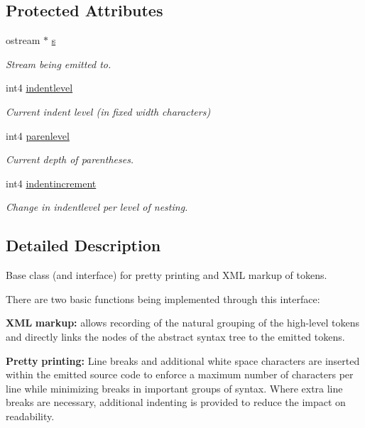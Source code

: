 \subsection*{Protected Attributes}
\begin{DoxyCompactItemize}
\item 
ostream $\ast$ \mbox{\hyperlink{class_emit_xml_adfd933b95bdda7bac877f5273d22b53c}{s}}
\begin{DoxyCompactList}\small\item\em Stream being emitted to. \end{DoxyCompactList}\item 
int4 \mbox{\hyperlink{class_emit_xml_abf74600f6797a26565f5a1e45eadaee2}{indentlevel}}
\begin{DoxyCompactList}\small\item\em Current indent level (in fixed width characters) \end{DoxyCompactList}\item 
int4 \mbox{\hyperlink{class_emit_xml_a00ec9002c83214ef6d43441ddaf4fc78}{parenlevel}}
\begin{DoxyCompactList}\small\item\em Current depth of parentheses. \end{DoxyCompactList}\item 
int4 \mbox{\hyperlink{class_emit_xml_ad7b8e7e8c38bd2588fdfab16d18569f4}{indentincrement}}
\begin{DoxyCompactList}\small\item\em Change in indentlevel per level of nesting. \end{DoxyCompactList}\end{DoxyCompactItemize}


\subsection{Detailed Description}
Base class (and interface) for pretty printing and X\+ML markup of tokens. 

There are two basic functions being implemented through this interface\+:

{\bfseries{X\+ML}} {\bfseries{markup\+:}} allows recording of the natural grouping of the high-\/level tokens and directly links the nodes of the abstract syntax tree to the emitted tokens.

{\bfseries{Pretty}} {\bfseries{printing\+:}} Line breaks and additional white space characters are inserted within the emitted source code to enforce a maximum number of characters per line while minimizing breaks in important groups of syntax. Where extra line breaks are necessary, additional indenting is provided to reduce the impact on readability.

